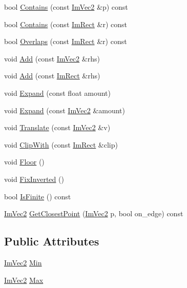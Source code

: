 \begin{DoxyCompactItemize}
bool \hyperlink{struct_im_rect_ac583156fd0e9306181fff5d120b262ea}{Contains} (const \hyperlink{struct_im_vec2}{Im\+Vec2} \&p) const
\item 
bool \hyperlink{struct_im_rect_ad6043344d8ac30d5f342c71641cfe24b}{Contains} (const \hyperlink{struct_im_rect}{Im\+Rect} \&r) const
\item 
bool \hyperlink{struct_im_rect_a0af3bade3781e5e7c6afdf71ccfb0d43}{Overlaps} (const \hyperlink{struct_im_rect}{Im\+Rect} \&r) const
\item 
void \hyperlink{struct_im_rect_a9d6cbef8c86ca01a16bb0fd35b457f88}{Add} (const \hyperlink{struct_im_vec2}{Im\+Vec2} \&rhs)
\item 
void \hyperlink{struct_im_rect_a9bcb65fd17843c74555291a522e9ebdf}{Add} (const \hyperlink{struct_im_rect}{Im\+Rect} \&rhs)
\item 
void \hyperlink{struct_im_rect_af33a7424c3341d08acd69da30c27c753}{Expand} (const float amount)
\item 
void \hyperlink{struct_im_rect_ac0b0b88fe65725b4694cd7d91d42d382}{Expand} (const \hyperlink{struct_im_vec2}{Im\+Vec2} \&amount)
\item 
void \hyperlink{struct_im_rect_ae964217d0317002b1ae80f935c97e689}{Translate} (const \hyperlink{struct_im_vec2}{Im\+Vec2} \&v)
\item 
void \hyperlink{struct_im_rect_a5e220ababe2fa079638aab8f4b0b8ace}{Clip\+With} (const \hyperlink{struct_im_rect}{Im\+Rect} \&clip)
\item 
void \hyperlink{struct_im_rect_a8fdf75a0c64ff29f65113cd9f8be77ab}{Floor} ()
\item 
void \hyperlink{struct_im_rect_a4953af0924e672abfd15c0ccf16f4607}{Fix\+Inverted} ()
\item 
bool \hyperlink{struct_im_rect_afec66fe1b403affd12409cb8303fbab8}{Is\+Finite} () const
\item 
\hyperlink{struct_im_vec2}{Im\+Vec2} \hyperlink{struct_im_rect_a223c67d4c93e5c87a33a68ebb527bbb8}{Get\+Closest\+Point} (\hyperlink{struct_im_vec2}{Im\+Vec2} p, bool on\+\_\+edge) const
\end{DoxyCompactItemize}
\subsection*{Public Attributes}
\begin{DoxyCompactItemize}
\item 
\hyperlink{struct_im_vec2}{Im\+Vec2} \hyperlink{struct_im_rect_af8f3fbf7ec983e03548b88e14ba68aa8}{Min}
\item 
\hyperlink{struct_im_vec2}{Im\+Vec2} \hyperlink{struct_im_rect_aad58c13340d320b350a72a037e3f7628}{Max}
\end{DoxyCompactItemize}


